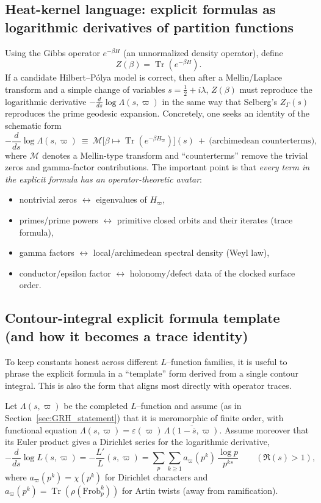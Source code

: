 \documentclass[11pt,oneside]{amsbook}
\numberwithin{equation}{section}
\theoremstyle{plain}
\theoremstyle{definition}
\theoremstyle{remark}
\DeclareMathOperator{\Tr}{\mathrm{Tr}}
\begin{document}
\subsection{Heat-kernel language: explicit formulas as logarithmic derivatives of partition functions}
Using the Gibbs operator $e^{-\beta H}$ (an unnormalized density operator), define
\[
Z(\beta)=\Tr(e^{-\beta H}).
\]
If a candidate Hilbert--Pólya model is correct, then after a Mellin/Laplace transform and a simple change of variables $s=\tfrac12+i\lambda$, $Z(\beta)$ must reproduce the logarithmic derivative $-\frac{d}{ds}\log\Lambda(s,\varpi)$ in the same way that Selberg's $Z_\Gamma(s)$ reproduces the prime geodesic expansion.
Concretely, one seeks an identity of the schematic form
\[
-\frac{d}{ds}\log\Lambda(s,\varpi)
\ \equiv\
\mathcal{M}\bigl[\beta\mapsto \Tr(e^{-\beta H_\varpi})\bigr](s)
\ +\ \text{(archimedean counterterms)},
\]
where $\mathcal{M}$ denotes a Mellin-type transform and ``counterterms'' remove the trivial zeros and gamma-factor contributions.
The important point is that \emph{every term in the explicit formula has an operator-theoretic avatar}:
\begin{itemize}
\item nontrivial zeros $\leftrightarrow$ eigenvalues of $H_\varpi$,
\item primes/prime powers $\leftrightarrow$ primitive closed orbits and their iterates (trace formula),
\item gamma factors $\leftrightarrow$ local/archimedean spectral density (Weyl law),
\item conductor/epsilon factor $\leftrightarrow$ holonomy/defect data of the clocked surface order.
\end{itemize}



\subsection{Contour-integral explicit formula template (and how it becomes a trace identity)}
\label{sec:contour_explicit_formula_template}

To keep constants honest across different $L$--function families, it is useful to phrase the explicit formula in a ``template'' form derived from a single contour integral.
This is also the form that aligns most directly with operator traces.

Let $\Lambda(s,\varpi)$ be the completed $L$--function and assume (as in Section~\ref{sec:GRH_statement}) that it is meromorphic of finite order, with functional equation
$\Lambda(s,\varpi)=\varepsilon(\varpi)\,\overline{\Lambda(1-\overline{s},\varpi)}$.
Assume moreover that its Euler product gives a Dirichlet series for the logarithmic derivative,
\begin{equation}
\label{eq:log_derivative_generic}
-\frac{d}{ds}\log L(s,\varpi)= -\frac{L'}{L}(s,\varpi)
=\sum_{p}\sum_{k\ge 1} a_\varpi(p^k)\,\frac{\log p}{p^{ks}}
\qquad (\Re(s)>1),
\end{equation}
where $a_\varpi(p^k)=\chi(p^k)$ for Dirichlet characters and $a_\varpi(p^k)=\Tr(\rho(\mathrm{Frob}_p^k))$ for Artin twists (away from ramification).
\end{document}
